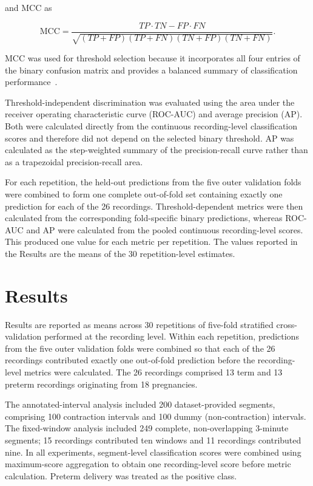 \documentclass[10pt,letterpaper]{article}
\begin{document}
and MCC as

\begin{equation}
\mathrm{MCC}
=
\frac{TP\cdot TN-FP\cdot FN}
{\sqrt{(TP+FP)(TP+FN)(TN+FP)(TN+FN)}}.
\end{equation}

MCC was used for threshold selection because it incorporates all four entries of the binary confusion matrix and provides a balanced summary of classification performance~\cite{Chicco2020_MCC}.

Threshold-independent discrimination was evaluated using the area under the receiver operating characteristic curve (ROC-AUC) and average precision (AP). Both were calculated directly from the continuous recording-level classification scores and therefore did not depend on the selected binary threshold. AP was calculated as the step-weighted summary of the precision-recall curve rather than as a trapezoidal precision-recall area.

For each repetition, the held-out predictions from the five outer validation folds were combined to form one complete out-of-fold set containing exactly one prediction for each of the 26 recordings. Threshold-dependent metrics were then calculated from the corresponding fold-specific binary predictions, whereas ROC-AUC and AP were calculated from the pooled continuous recording-level scores. This produced one value for each metric per repetition. The values reported in the Results are the means of the 30 repetition-level estimates.

\section*{Results}

Results are reported as means across 30 repetitions of five-fold stratified cross-validation performed at the recording level. Within each repetition, predictions from the five outer validation folds were combined so that each of the 26 recordings contributed exactly one out-of-fold prediction before the recording-level metrics were calculated. The 26 recordings comprised 13 term and 13 preterm recordings originating from 18 pregnancies.

The annotated-interval analysis included 200 dataset-provided segments, comprising 100 contraction intervals and 100 dummy (non-contraction) intervals. The fixed-window analysis included 249 complete, non-overlapping 3-minute segments; 15 recordings contributed ten windows and 11 recordings contributed nine. In all experiments, segment-level classification scores were combined using maximum-score aggregation to obtain one recording-level score before metric calculation. Preterm delivery was treated as the positive class.
\end{document}
